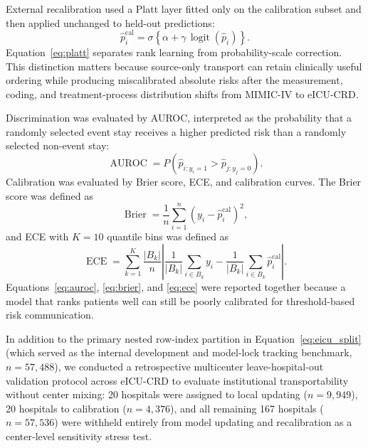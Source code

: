 \documentclass[utf8]{FrontiersinVancouver}
\newcommand{\re}[1]{#1}
\begin{document}
External recalibration used a Platt layer fitted only on the calibration subset and then applied unchanged to held-out predictions:
\begin{equation}
\hat{p}^{\mathrm{cal}}_i=
\sigma\left\{\alpha+\gamma\,\operatorname{logit}(\hat{p}_i)\right\}.
\label{eq:platt}
\end{equation}
Equation~\ref{eq:platt} separates rank learning from probability-scale correction. This distinction matters because source-only transport can retain clinically useful ordering while producing miscalibrated absolute risks after the measurement, coding, and treatment-process distribution shifts from MIMIC-IV to eICU-CRD.

Discrimination was evaluated by AUROC, interpreted as the probability that a randomly selected event stay receives a higher predicted risk than a randomly selected non-event stay:
\begin{equation}
\operatorname{AUROC}=P(\hat{p}_{i:y_i=1}>\hat{p}_{j:y_j=0}).
\label{eq:auroc}
\end{equation}
Calibration was evaluated by Brier score, ECE, and calibration curves. The Brier score was defined as
\begin{equation}
\operatorname{Brier}=\frac{1}{n}\sum_{i=1}^{n}(y_i-\hat{p}^{\mathrm{cal}}_i)^2,
\label{eq:brier}
\end{equation}
and ECE with $K=10$ quantile bins was defined as
\begin{equation}
\operatorname{ECE}=\sum_{k=1}^{K}\frac{|B_k|}{n}\left|
\frac{1}{|B_k|}\sum_{i\in B_k}y_i-
\frac{1}{|B_k|}\sum_{i\in B_k}\hat{p}^{\mathrm{cal}}_i
\right|.
\label{eq:ece}
\end{equation}
Equations~\ref{eq:auroc}, \ref{eq:brier}, and \ref{eq:ece} were reported together because a model that ranks patients well can still be poorly calibrated for threshold-based risk communication.

\re{In addition to the primary nested row-index partition in Equation~\ref{eq:eicu_split} (which served as the internal development and model-lock tracking benchmark, $n=57{,}488$), we conducted a retrospective multicenter leave-hospital-out validation protocol across eICU-CRD to evaluate institutional transportability without center mixing: 20 hospitals were assigned to local updating ($n=9{,}949$), 20 hospitals to calibration ($n=4{,}376$), and all remaining 167 hospitals ($n=57{,}536$) were withheld entirely from model updating and recalibration as a center-level sensitivity stress test.}
\end{document}
